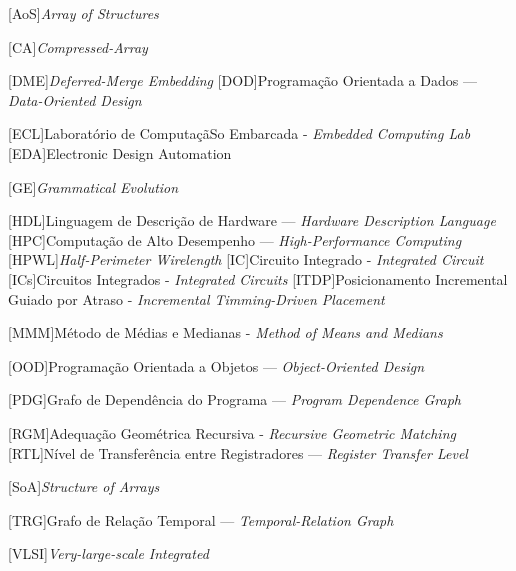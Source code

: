 \begin{acronym}
\setlength{\parskip}{0ex}
\setlength{\itemsep}{1ex}


\renewcommand{\baselinestretch}{0.25}%
\large\normalsize%
\renewcommand{\baselinestretch}{1}%
\large\normalsize%


[AoS]{\textit{Array of Structures}}

[CA]{\textit{Compressed-Array}}

[DME]{\textit{Deferred-Merge Embedding}}
[DOD]{Programação Orientada a Dados --- \textit{Data-Oriented Design}}

[ECL]{Laboratório de ComputaçãSo Embarcada - \textit{Embedded Computing Lab}}
[EDA]{Electronic Design Automation}


[GE]{\textit{Grammatical Evolution}}

[HDL]{Linguagem de Descrição de Hardware --- \textit{Hardware Description Language}}
[HPC]{Computação de Alto Desempenho --- \textit{High-Performance Computing}}
[HPWL]{\textit{Half-Perimeter Wirelength}}
[IC]{Circuito Integrado - \textit{Integrated Circuit}}
[ICs]{Circuitos Integrados - \textit{Integrated Circuits}}
[ITDP]{Posicionamento Incremental Guiado por Atraso - \textit{Incremental Timming-Driven Placement}}



[MMM]{Método de Médias e Medianas - \textit{Method of Means and Medians}}


[OOD]{Programação Orientada a Objetos --- \textit{Object-Oriented Design}}

[PDG]{Grafo de Dependência do Programa --- \textit{Program Dependence Graph}}

[RGM]{Adequação Geométrica Recursiva - \textit{Recursive Geometric Matching}}
[RTL]{Nível de Transferência entre Registradores --- \textit{Register Transfer Level}}

[SoA]{\textit{Structure of Arrays}}

[TRG]{Grafo de Relação Temporal --- \textit{Temporal-Relation Graph}}

[VLSI]{\textit{Very-large-scale Integrated}}



\end{acronym}